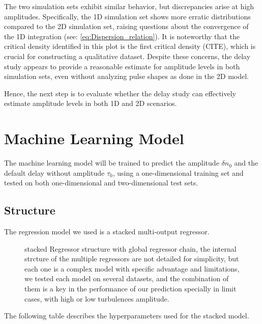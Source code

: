 \documentclass[11pt,a4paper,openany]{report}
\begin{document}
\begin{multicols}{2}
    The two simulation sets exhibit similar behavior, but discrepancies arise at high amplitudes. Specifically, the 1D simulation set shows more erratic distributions compared to the 2D simulation set, raising questions about the convergence of the 1D integration (see: \ref{eq:Dispersion_relation}). It is noteworthy that the critical density identified in this plot is the first critical density (CITE), which is crucial for constructing a qualitative dataset. Despite these concerns, the delay study appears to provide a reasonable estimate for amplitude levels in both simulation sets, even without analyzing pulse shapes as done in the 2D model.

    Hence, the next step is to evaluate whether the delay study can effectively estimate amplitude levels in both 1D and 2D scenarios.

    \section{Machine Learning Model}

    The machine learning model will be trained to predict the amplitude $\delta n_0$ and the default delay without amplitude $\tau_0$, using a one-dimensional training set and tested on both one-dimensional and two-dimensional test sets.

    \subsection{Structure}

    The regression model we used is a stacked multi-output regressor.

    \begin{figure}[H]
        \def\svgwidth{\linewidth}
        \centering
        
        \caption{stacked Regressor structure with global regressor chain, the internal strcture of the multiple regressors are not detailed for simplicity, but each one is a complex model with specific advantage and limitations, we tested each model on several datasets, and the combination of them is a key in the performance of our prediction specially in limit cases, with high or low turbulences amplitude.}
    \end{figure}


    The following table describes the hyperparameters used for the stacked model.


\end{multicols}
\end{document}
